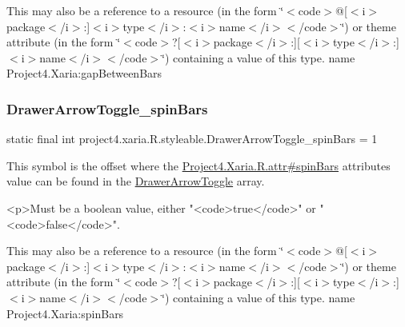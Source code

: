 This may also be a reference to a resource (in the form \char`\"{}$<$code$>$@\mbox{[}$<$i$>$package$<$/i$>$\+:\mbox{]}$<$i$>$type$<$/i$>$\+:$<$i$>$name$<$/i$>$$<$/code$>$\char`\"{}) or theme attribute (in the form \char`\"{}$<$code$>$?\mbox{[}$<$i$>$package$<$/i$>$\+:\mbox{]}\mbox{[}$<$i$>$type$<$/i$>$\+:\mbox{]}$<$i$>$name$<$/i$>$$<$/code$>$\char`\"{}) containing a value of this type.  name Project4.\+Xaria\+:gap\+Between\+Bars \mbox{\label{classproject4_1_1xaria_1_1R_1_1styleable_a677c43a06f3156ddaadcaf41f4a5f63a}} 
\subsubsection{\texorpdfstring{Drawer\+Arrow\+Toggle\+\_\+spin\+Bars}{DrawerArrowToggle\_spinBars}}
{\footnotesize\ttfamily static final int project4.\+xaria.\+R.\+styleable.\+Drawer\+Arrow\+Toggle\+\_\+spin\+Bars = 1\hspace{0.3cm}{\ttfamily [static]}}

This symbol is the offset where the \hyperlink{}{Project4.\+Xaria.\+R.\+attr\#spin\+Bars} attribute\textquotesingle{}s value can be found in the \hyperlink{classproject4_1_1xaria_1_1R_1_1styleable_aa8594da8de0b2617c3d5cd5e028f8b77}{Drawer\+Arrow\+Toggle} array.

\begin{DoxyVerb}      <p>Must be a boolean value, either "<code>true</code>" or "<code>false</code>".
\end{DoxyVerb}
 

This may also be a reference to a resource (in the form \char`\"{}$<$code$>$@\mbox{[}$<$i$>$package$<$/i$>$\+:\mbox{]}$<$i$>$type$<$/i$>$\+:$<$i$>$name$<$/i$>$$<$/code$>$\char`\"{}) or theme attribute (in the form \char`\"{}$<$code$>$?\mbox{[}$<$i$>$package$<$/i$>$\+:\mbox{]}\mbox{[}$<$i$>$type$<$/i$>$\+:\mbox{]}$<$i$>$name$<$/i$>$$<$/code$>$\char`\"{}) containing a value of this type.  name Project4.\+Xaria\+:spin\+Bars \mbox{\label{classproject4_1_1xaria_1_1R_1_1styleable_ada3e7dfa18bdce491e278c71b0c30013}} 
